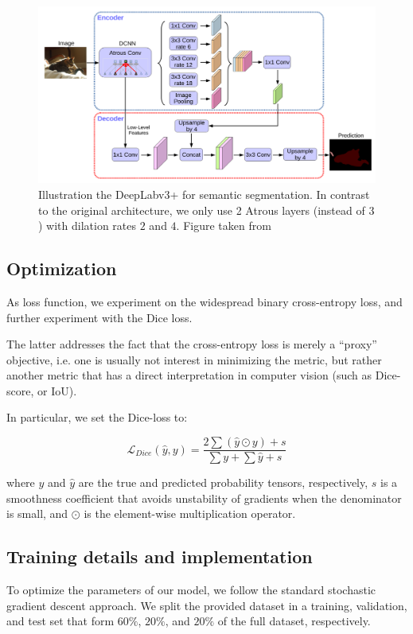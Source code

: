 \documentclass[11pt]{article}
\begin{document}
\begin{figure}[htbp]
\centering
\includegraphics[width=.9\linewidth]{./deeplabv3p.png}
\caption{\label{fig:deeplabv3p}Illustration the DeepLabv3+ for semantic segmentation. In contrast to the original architecture, we only use 2 Atrous layers (instead of \(3\)) with dilation rates \(2\) and \(4\). Figure taken from \cite{chen18}}
\end{figure}

\subsection{Optimization}
\label{sec:orgfa18d66}

As loss function, we experiment on the widespread binary cross-entropy loss,
and further experiment with the Dice loss.

The latter addresses the fact that the cross-entropy loss is merely a ``proxy'' objective,
i.e. one is usually not interest in minimizing the metric, but rather
another metric that has a direct interpretation in computer vision (such as Dice-score,
or IoU).

In particular, we set the Dice-loss to:

\[
\mathcal{L}_{Dice}(\hat{y}, y) = \frac{2 \sum (\hat{y} \odot y) + s}{\sum y + \sum \hat{y} + s}
\]

where \(y\) and \(\hat{y}\) are the true and predicted probability tensors, respectively,
\(s\) is a smoothness coefficient that avoids unstability of gradients when
the denominator is small, and \(\odot\) is the element-wise multiplication operator.

\subsection{Training details and implementation}
\label{sec:orgf470934}

To optimize the parameters of our model, we follow the standard stochastic gradient descent
approach.
We split the provided dataset in a training, validation, and test set
that form \(60\%\), \(20\%\), and \(20\%\) of the full dataset, respectively.
\end{document}
